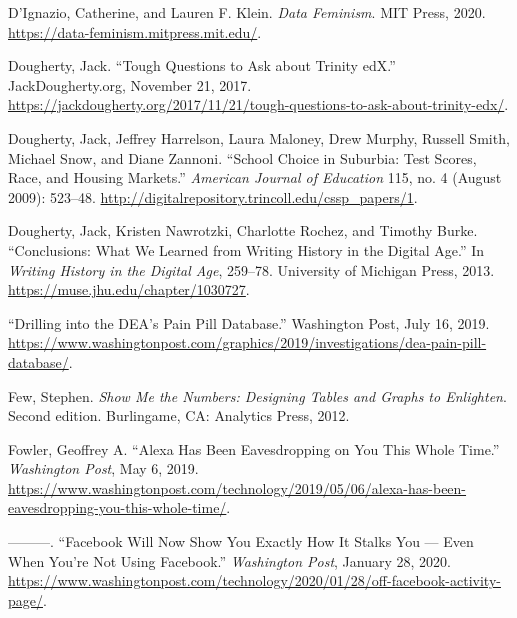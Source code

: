 \documentclass[
  english,
]{book}
\newlength{\cslhangindent}
\newlength{\cslentryspacingunit} %
\newenvironment{CSLReferences}[2] %
 {%
  \setlength{\parindent}{0pt}
  \ifodd #1
  \let\oldpar\par
  \def\par{\hangindent=\cslhangindent\oldpar}
  \fi
  \setlength{\parskip}{#2\cslentryspacingunit}
 }%
 {}
\begin{document}
\begin{CSLReferences}{1}{0}
\leavevmode{}%
D'Ignazio, Catherine, and Lauren F. Klein. \emph{Data {Feminism}}. {MIT Press}, 2020. \url{https://data-feminism.mitpress.mit.edu/}.

\leavevmode{}%
Dougherty, Jack. {``Tough {Questions} to {Ask} about {Trinity edX}.''} {JackDougherty.org}, November 21, 2017. \url{https://jackdougherty.org/2017/11/21/tough-questions-to-ask-about-trinity-edx/}.

\leavevmode{}%
Dougherty, Jack, Jeffrey Harrelson, Laura Maloney, Drew Murphy, Russell Smith, Michael Snow, and Diane Zannoni. {``School {Choice} in {Suburbia}: {Test Scores}, {Race}, and {Housing Markets}.''} \emph{American Journal of Education} 115, no. 4 (August 2009): 523--48. \url{http://digitalrepository.trincoll.edu/cssp_papers/1}.

\leavevmode{}%
Dougherty, Jack, Kristen Nawrotzki, Charlotte Rochez, and Timothy Burke. {``Conclusions: {What We Learned} from {Writing History} in the {Digital Age}.''} In \emph{Writing {History} in the {Digital Age}}, 259--78. {University of Michigan Press}, 2013. \url{https://muse.jhu.edu/chapter/1030727}.

\leavevmode{}%
{``Drilling into the {DEA}'s {Pain Pill Database}.''} {Washington Post}, July 16, 2019. \url{https://www.washingtonpost.com/graphics/2019/investigations/dea-pain-pill-database/}.

\leavevmode{}%
Few, Stephen. \emph{Show {Me} the {Numbers}: {Designing Tables} and {Graphs} to {Enlighten}}. Second edition. {Burlingame, CA}: {Analytics Press}, 2012.

\leavevmode{}%
Fowler, Geoffrey A. {``Alexa {Has Been Eavesdropping} on {You This Whole Time}.''} \emph{Washington Post}, May 6, 2019. \url{https://www.washingtonpost.com/technology/2019/05/06/alexa-has-been-eavesdropping-you-this-whole-time/}.

\leavevmode{}%
---------. {``Facebook {Will Now Show You Exactly How It Stalks You} --- {Even When You}'re {Not Using Facebook}.''} \emph{Washington Post}, January 28, 2020. \url{https://www.washingtonpost.com/technology/2020/01/28/off-facebook-activity-page/}.


\end{CSLReferences}
\end{document}
